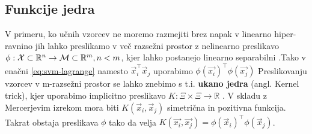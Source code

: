 \subsection{Funkcije jedra}
V primeru, ko učnih vzorcev ne moremo razmejiti brez napak v linearno hiper-ravnino jih lahko preslikamo v več razsežni prostor z nelinearno preslikavo $\phi: \mathcal{X} \subset \mathbb{R}^n \to \mathcal{M} \subset \mathbb{R}^m, n < m$, kjer lahko postanejo linearno separabilni \cite{chapelle1999support,boughorbel2005generalized}.Tako v enačni \eqref{eq:svm-lagrange} namesto $\vec{x}_i^\top\vec{x}_j$ uporabimo $\phi(\vec{x_i})^\top\phi(\vec{x_j})$ Preslikovanju vzorcev v m-razsežni prostor se lahko znebimo s t.i. \textbf{ukano jedra} (angl. Kernel trick), kjer uporabimo implicitno preslikavo $K: \mathcal{\Xi} \times \mathcal{\Xi} \to \mathbb{R}$ \cite{boughorbel2005generalized}. V skladu z Mercerjevim izrekom mora biti $K(\vec{x}_i,\vec{x}_j)$ simetrična in pozitivna funkcija. Takrat obstaja preslikava $\phi$ tako da velja $K(\vec{x_i}, \vec{x_j}) = \phi(\vec{x}_i)^\top\phi(\vec{x}_j)$.


